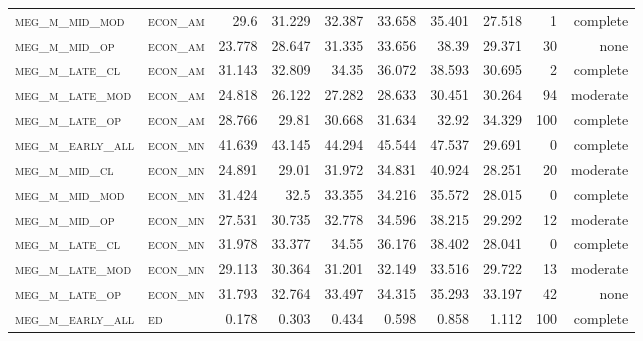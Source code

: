 \begin{landscape}
\begin{center}
\begin{footnotesize}
\begin{longtable}{llrrrrr|rrr}
\textsc{meg\_m\_mid\_mod  } & \textsc{econ\_am  }    & 29.6     & 31.229   & 32.387   & 33.658   & 35.401     & 27.518        & 1             & complete             \\
\textsc{meg\_m\_mid\_op   } & \textsc{econ\_am  }    & 23.778   & 28.647   & 31.335   & 33.656   & 38.39      & 29.371        & 30            & none             \\
\textsc{meg\_m\_late\_cl  } & \textsc{econ\_am  }    & 31.143   & 32.809   & 34.35    & 36.072   & 38.593     & 30.695        & 2             & complete             \\
\textsc{meg\_m\_late\_mod } & \textsc{econ\_am  }    & 24.818   & 26.122   & 27.282   & 28.633   & 30.451     & 30.264        & 94            & moderate              \\
\textsc{meg\_m\_late\_op  } & \textsc{econ\_am  }    & 28.766   & 29.81    & 30.668   & 31.634   & 32.92      & 34.329        & 100           & complete             \\
\textsc{meg\_m\_early\_all} & \textsc{econ\_mn  }    & 41.639   & 43.145   & 44.294   & 45.544   & 47.537     & 29.691        & 0             & complete            \\
\textsc{meg\_m\_mid\_cl   } & \textsc{econ\_mn  }    & 24.891   & 29.01    & 31.972   & 34.831   & 40.924     & 28.251        & 20            & moderate             \\
\textsc{meg\_m\_mid\_mod  } & \textsc{econ\_mn  }    & 31.424   & 32.5     & 33.355   & 34.216   & 35.572     & 28.015        & 0             & complete            \\
\textsc{meg\_m\_mid\_op   } & \textsc{econ\_mn  }    & 27.531   & 30.735   & 32.778   & 34.596   & 38.215     & 29.292        & 12            & moderate             \\
\textsc{meg\_m\_late\_cl  } & \textsc{econ\_mn  }    & 31.978   & 33.377   & 34.55    & 36.176   & 38.402     & 28.041        & 0             & complete            \\
\textsc{meg\_m\_late\_mod } & \textsc{econ\_mn  }    & 29.113   & 30.364   & 31.201   & 32.149   & 33.516     & 29.722        & 13            & moderate             \\
\textsc{meg\_m\_late\_op  } & \textsc{econ\_mn  }    & 31.793   & 32.764   & 33.497   & 34.315   & 35.293     & 33.197        & 42            & none             \\
\textsc{meg\_m\_early\_all} & \textsc{ed        }    & 0.178    & 0.303    & 0.434    & 0.598    & 0.858      & 1.112         & 100           & complete             \\

\end{longtable}
\end{footnotesize}
\end{center}
\end{landscape}
